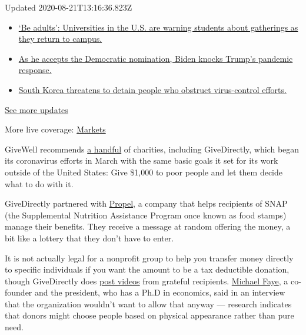 Updated 2020-08-21T13:16:36.823Z

\begin{itemize}
\tightlist
\item
  \href{https://www.nytimes3xbfgragh.onion/2020/08/21/world/covid-19-coronavirus.html?action=click\&pgtype=Article\&state=default\&region=MAIN_CONTENT_1\&context=storylines_live_updates\#link-6a60a19d}{`Be
  adults': Universities in the U.S. are warning students about
  gatherings as they return to campus.}
\item
  \href{https://www.nytimes3xbfgragh.onion/2020/08/21/world/covid-19-coronavirus.html?action=click\&pgtype=Article\&state=default\&region=MAIN_CONTENT_1\&context=storylines_live_updates\#link-324af071}{As
  he accepts the Democratic nomination, Biden knocks Trump's pandemic
  response.}
\item
  \href{https://www.nytimes3xbfgragh.onion/2020/08/21/world/covid-19-coronavirus.html?action=click\&pgtype=Article\&state=default\&region=MAIN_CONTENT_1\&context=storylines_live_updates\#link-191d44be}{South
  Korea threatens to detain people who obstruct virus-control efforts.}
\end{itemize}

\href{https://www.nytimes3xbfgragh.onion/2020/08/21/world/covid-19-coronavirus.html?action=click\&pgtype=Article\&state=default\&region=MAIN_CONTENT_1\&context=storylines_live_updates}{See
more updates}

More live coverage:
\href{https://www.nytimes3xbfgragh.onion/live/2020/08/21/business/stock-market-today-coronavirus?action=click\&pgtype=Article\&state=default\&region=MAIN_CONTENT_1\&context=storylines_live_updates}{Markets}

GiveWell recommends
\href{https://www.givewell.org/charities/top-charities}{a handful} of
charities, including GiveDirectly, which began its coronavirus efforts
in March with the same basic goals it set for its work outside of the
United States: Give \$1,000 to poor people and let them decide what to
do with it.

GiveDirectly partnered with
\href{https://www.joinpropel.com/covid-19}{Propel}, a company that helps
recipients of SNAP (the Supplemental Nutrition Assistance Program once
known as food stamps) manage their benefits. They receive a message at
random offering the money, a bit like a lottery that they don't have to
enter.

It is not actually legal for a nonprofit group to help you transfer
money directly to specific individuals if you want the amount to be a
tax deductible donation, though GiveDirectly does
\href{https://www.givedirectly.org/covid-19/us/recipient-stories/}{post
videos} from grateful recipients.
\href{https://www.givedirectly.org/team/}{Michael Faye}, a co-founder
and the president, who has a Ph.D in economics, said in an interview
that the organization wouldn't want to allow that anyway --- research
indicates that donors might choose people based on physical appearance
rather than pure need.

